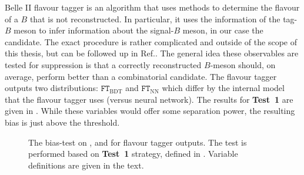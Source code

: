 Belle II flavour tagger is an algorithm that uses \MVA methods to determine the flavour of a $B$ that is not reconstructed.
In particular, it uses the information of the tag-$B$ meson to infer information about the signal-$B$ meson, in our case the \BtoXsgamma candidate.
The exact procedure is rather complicated and outside of the scope of this thesis, but can be followed up in Ref.\cite{Belle-II:2021zvj}.
The general idea these observables are tested for \epem\ra\qqbar suppression is that a correctly reconstructed $B$-meson should, on average, perform better than a combinatorial \qqbar candidate.
The flavour tagger outputs two distributions: $\mathtt{FT}_{\mathrm{BDT}}$ and $\mathtt{FT}_{\mathrm{NN}}$ which differ by the internal model that the flavour tagger uses (\BDT versus neural network).
The results for \textbf{Test~1} are given in .
While these variables would offer some separation power, the resulting bias is just above the threshold.

\begin{figure}[htbp!]
    \caption{\label{fig:flavour_tagger_outputs} The bias-test on \EB, \Estar and \Mbc for flavour tagger outputs.
    The test is performed based on \textbf{Test~1} strategy, defined in .
    Variable definitions are given in the text.}
\end{figure}
